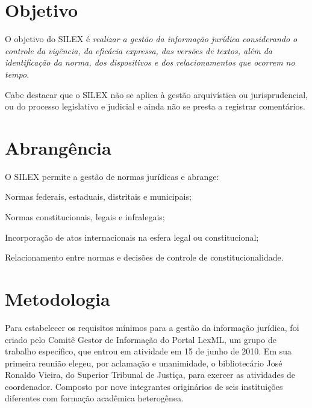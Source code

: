 \documentclass[a4paper,11pt,openright,twoside,english,brazil]{abntex2}
\begin{document}
\section{Objetivo}


O objetivo do SILEX é \emph{realizar a gestão da informação jurídica
considerando o controle da vigência, da eficácia expressa, das versões de
textos, além da identificação da norma, dos dispositivos e dos relacionamentos
que ocorrem no tempo}.

Cabe destacar que o SILEX não se aplica à gestão arquivística ou jurisprudencial, ou do processo
legislativo e judicial e ainda não se presta a registrar
comentários.

\section{Abrangência}

O SILEX permite a gestão de normas jurídicas e abrange:

\begin{alineas}
 \item Normas federais, estaduais, distritais e municipais;
 \item Normas constitucionais, legais e infralegais;
 \item Incorporação de atos internacionais na esfera legal ou constitucional;
 \item Relacionamento entre normas e decisões de controle de
 constitucionalidade.
\end{alineas}

\section{Metodologia}

Para estabelecer os requisitos mínimos para a gestão da informação jurídica, foi
criado pelo Comitê Gestor de Informação do Portal LexML, um grupo de trabalho
específico, que entrou em atividade em 15 de junho de 2010. Em sua primeira
reunião elegeu, por aclamação e unanimidade, o bibliotecário José Ronaldo
Vieira, do Superior Tribunal de Justiça, para exercer as atividades de
coordenador. Composto por nove integrantes originários de seis instituições
diferentes com formação acadêmica heterogênea.
\end{document}
